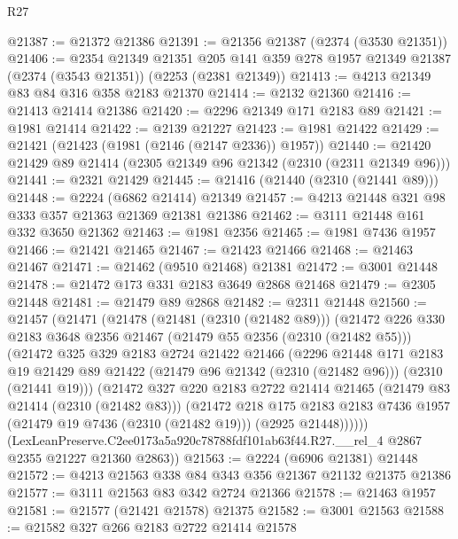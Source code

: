 \begin{lexlean}{R27}
\begin{coremodule}
@21387 := @21372 @21386
@21391 := @21356 @21387 (@2374 (@3530 @21351))
@21406 := @2354
    @21349
    @21351
    @205
    @141
    @359
    @278
    @1957
    @21349
    @21387
    (@2374 (@3543 @21351))
    (@2253 (@2381 @21349))
@21413 := @4213 @21349 @83 @84 @316 @358 @2183 @21370
@21414 := @2132 @21360
@21416 := @21413 @21414 @21386
@21420 := @2296 @21349 @171 @2183 @89
@21421 := @1981 @21414
@21422 := @2139 @21227
@21423 := @1981 @21422
@21429 := @21421 (@21423 (@1981 (@2146 (@2147 @2336)) @1957))
@21440 := @21420 @21429 @89 @21414 (@2305 @21349 @96 @21342 (@2310 (@2311 @21349 @96)))
@21441 := @2321 @21429
@21445 := @21416 (@21440 (@2310 (@21441 @89)))
@21448 := @2224 (@6862 @21414) @21349
@21457 := @4213 @21448 @321 @98 @333 @357 @21363 @21369 @21381 @21386
@21462 := @3111 @21448 @161 @332 @3650 @21362
@21463 := @1981 @2356
@21465 := @1981 @7436 @1957
@21466 := @21421 @21465
@21467 := @21423 @21466
@21468 := @21463 @21467
@21471 := @21462 (@9510 @21468) @21381
@21472 := @3001 @21448
@21478 := @21472 @173 @331 @2183 @3649 @2868 @21468
@21479 := @2305 @21448
@21481 := @21479 @89 @2868
@21482 := @2311 @21448
@21560 := @21457
    (@21471
      (@21478
        (@21481 (@2310 (@21482 @89)))
        (@21472
          @226
          @330
          @2183
          @3648
          @2356
          @21467
          (@21479 @55 @2356 (@2310 (@21482 @55)))
          (@21472
            @325
            @329
            @2183
            @2724
            @21422
            @21466
            (@2296
              @21448
              @171
              @2183
              @19
              @21429
              @89
              @21422
              (@21479 @96 @21342 (@2310 (@21482 @96)))
              (@2310 (@21441 @19)))
            (@21472
              @327
              @220
              @2183
              @2722
              @21414
              @21465
              (@21479 @83 @21414 (@2310 (@21482 @83)))
              (@21472
                @218
                @175
                @2183
                @2183
                @7436
                @1957
                (@21479 @19 @7436 (@2310 (@21482 @19)))
                (@2925 @21448))))))
      (LexLeanPreserve.C2ee0173a5a920c78788fdf101ab63f44.R27.__rel_4
        @2867
        @2355
        @21227
        @21360
        @2863))
@21563 := @2224 (@6906 @21381) @21448
@21572 := @4213 @21563 @338 @84 @343 @356 @21367 @21132 @21375 @21386
@21577 := @3111 @21563 @83 @342 @2724 @21366
@21578 := @21463 @1957
@21581 := @21577 (@21421 @21578) @21375
@21582 := @3001 @21563
@21588 := @21582 @327 @266 @2183 @2722 @21414 @21578

\end{coremodule}
\end{lexlean}
